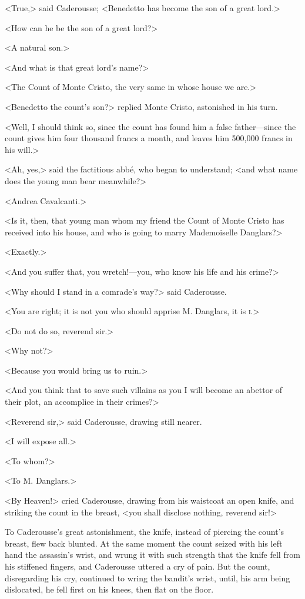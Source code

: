  <True,> said Caderousse; <Benedetto has become the son of a great lord.> 

 <How can he be the son of a great lord?> 

 <A natural son.> 

 <And what is that great lord's name?> 

 <The Count of Monte Cristo, the very same in whose house we are.> 

 <Benedetto the count's son?> replied Monte Cristo, astonished in his turn. 

 <Well, I should think so, since the count has found him a false father—since the count gives him four thousand francs a month, and leaves him 500,000 francs in his will.> 

 <Ah, yes,> said the factitious abbé, who began to understand; <and what name does the young man bear meanwhile?> 

 <Andrea Cavalcanti.> 

 <Is it, then, that young man whom my friend the Count of Monte Cristo has received into his house, and who is going to marry Mademoiselle Danglars?> 

 <Exactly.> 

 <And you suffer that, you wretch!—you, who know his life and his crime?> 

 <Why should I stand in a comrade's way?> said Caderousse. 

 <You are right; it is not you who should apprise M. Danglars, it is \textsc{i.}> 

 <Do not do so, reverend sir.> 

 <Why not?> 

 <Because you would bring us to ruin.> 

 <And you think that to save such villains as you I will become an abettor of their plot, an accomplice in their crimes?> 

 <Reverend sir,> said Caderousse, drawing still nearer. 

 <I will expose all.> 

 <To whom?> 

 <To M. Danglars.> 

 <By Heaven!> cried Caderousse, drawing from his waistcoat an open knife, and striking the count in the breast, <you shall disclose nothing, reverend sir!> 

 To Caderousse's great astonishment, the knife, instead of piercing the count's breast, flew back blunted. At the same moment the count seized with his left hand the assassin's wrist, and wrung it with such strength that the knife fell from his stiffened fingers, and Caderousse uttered a cry of pain. But the count, disregarding his cry, continued to wring the bandit's wrist, until, his arm being dislocated, he fell first on his knees, then flat on the floor. 

